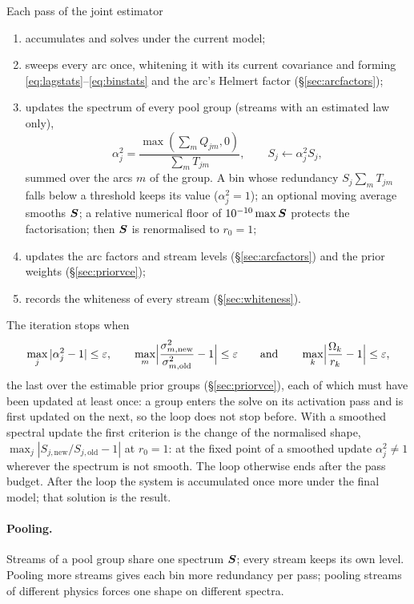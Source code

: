 Each pass of the joint estimator
\begin{enumerate}
\item accumulates and solves under the current model;
\item sweeps every arc once, whitening it with its current covariance and forming
  \eqref{eq:lagstats}--\eqref{eq:binstats} and the arc's Helmert factor (\S\ref{sec:arcfactors});
\item updates the spectrum of every pool group (streams with an estimated law only),
  \begin{equation}\label{eq:psdupdate}
  \alpha_j^2=\frac{\max(\sum_mQ_{jm},0)}{\sum_mT_{jm}},\qquad S_j\leftarrow\alpha_j^2S_j ,
  \end{equation}
  summed over the arcs $m$ of the group. A bin whose redundancy $S_j\sum_mT_{jm}$ falls below a
  threshold keeps its value ($\alpha_j^2=1$); an optional moving average smooths $\bm{S}$; a
  relative numerical floor of $10^{-10}\max\bm{S}$ protects the factorisation; then $\bm{S}$ is
  renormalised to $r_0=1$;
\item updates the arc factors and stream levels (\S\ref{sec:arcfactors}) and the prior
  weights (\S\ref{sec:priorvce});
\item records the whiteness of every stream (\S\ref{sec:whiteness}).
\end{enumerate}
The iteration stops when
\begin{equation}
\max_j|\alpha_j^2-1|\le\varepsilon,\qquad\max_m\Bigl|\frac{\sigma^2_{m,\mathrm{new}}}{\sigma^2_{m,\mathrm{old}}}-1\Bigr|\le\varepsilon
\qquad\text{and}\qquad\max_k\Bigl|\frac{\Omega_k}{r_k}-1\Bigr|\le\varepsilon ,
\end{equation}
the last over the estimable prior groups (\S\ref{sec:priorvce}), each of which must have been
updated at least once: a group enters the solve on its activation pass and is first updated on the
next, so the loop does not stop before. With a smoothed spectral update the first criterion is the
change of the normalised shape, $\max_j|S_{j,\mathrm{new}}/S_{j,\mathrm{old}}-1|$ at $r_0=1$: at the
fixed point of a smoothed update $\alpha_j^2\ne1$ wherever the spectrum is not smooth. The loop
otherwise ends after the pass budget. After the loop the system is accumulated once more under the
final model; that solution is the result.

\paragraph{Pooling.} Streams of a pool group share one spectrum $\bm{S}$; every stream keeps its own
level. Pooling more streams gives each bin more redundancy per pass; pooling streams of different
physics forces one shape on different spectra.

